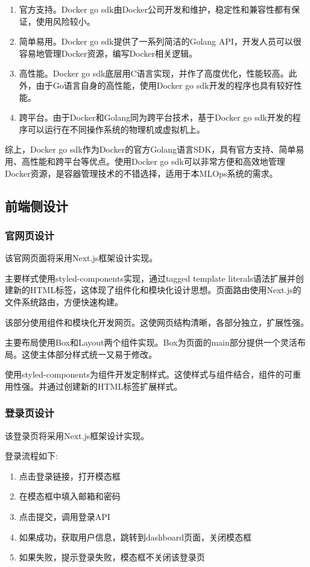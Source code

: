 \documentclass{HDU-Bachelor-Thesis}
\begin{document}
\begin{enumerate}   
    \item 官方支持。Docker go sdk由Docker公司开发和维护，稳定性和兼容性都有保证，使用风险较小。
    \item 简单易用。Docker go sdk提供了一系列简洁的Golang API，开发人员可以很容易地管理Docker资源，编写Docker相关逻辑。 
    \item 高性能。Docker go sdk底层用C语言实现，并作了高度优化，性能较高。此外，由于Go语言自身的高性能，使用Docker go sdk开发的程序也具有较好性能。
    \item 跨平台。由于Docker和Golang同为跨平台技术，基于Docker go sdk开发的程序可以运行在不同操作系统的物理机或虚拟机上。
\end{enumerate}

综上，Docker go sdk作为Docker的官方Golang语言SDK，具有官方支持、简单易用、高性能和跨平台等优点。使用Docker go sdk可以非常方便和高效地管理Docker资源，是容器管理技术的不错选择，适用于本MLOps系统的需求。

\subsection{前端侧设计}
\subsubsection{官网页设计}

该官网页面将采用Next.js框架设计实现。

主要样式使用styled-components实现，通过tagged template literals语法扩展并创建新的HTML标签，这体现了组件化和模块化设计思想。页面路由使用Next.js的文件系统路由，方便快速构建。

该部分使用组件和模块化开发网页。这使网页结构清晰，各部分独立，扩展性强。

主要布局使用Box和Layout两个组件实现。Box为页面的main部分提供一个灵活布局。这使主体部分样式统一又易于修改。

使用styled-components为组件开发定制样式。这使样式与组件结合，组件的可重用性强。并通过创建新的HTML标签扩展样式。

\subsubsection{登录页设计}

该登录页将采用Next.js框架设计实现。

登录流程如下:

\begin{enumerate}
\item 点击登录链接，打开模态框 
\item 在模态框中填入邮箱和密码
\item 点击提交，调用登录API 
\item 如果成功，获取用户信息，跳转到dashboard页面，关闭模态框
\item 如果失败，提示登录失败，模态框不关闭该登录页
\end{enumerate}
\end{document}

